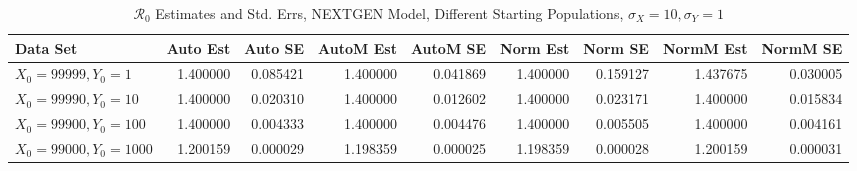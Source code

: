 \documentclass[12pt]{article}
\newcommand{\rr}{\ensuremath{\mathcal{R}_0}}
\begin{document}
\begin{table}[H]
	
	\caption{$\rr$ Estimates and Std. Errs, NEXTGEN Model,
		Different Starting Populations, 
		$\sigma_X = 10, \sigma_Y = 1$}
	\begin{footnotesize}
		\hskip -1.7cm
		\begin{tabular}{l|r|r|r|r|r|r|r|r}
			\hline
			Data Set & Auto Est & Auto SE & AutoM Est & AutoM SE & Norm Est & Norm SE & NormM Est & NormM SE\\
			\hline
			$X_0 = 99999, Y_0 = 1$ & 1.400000 & 0.085421 & 1.400000 & 0.041869 & 1.400000 & 0.159127 & 1.437675 & 0.030005\\
			\hline
			$X_0 = 99990, Y_0 = 10$ & 1.400000 & 0.020310 & 1.400000 & 0.012602 & 1.400000 & 0.023171 & 1.400000 & 0.015834\\
			\hline
			$X_0 = 99900, Y_0 = 100$ & 1.400000 & 0.004333 & 1.400000 & 0.004476 & 1.400000 & 0.005505 & 1.400000 & 0.004161\\
			\hline
			$X_0 = 99000, Y_0 = 1000$ & 1.200159 & 0.000029 & 1.198359 & 0.000025 & 1.198359 & 0.000028 & 1.200159 & 0.000031\\
			\hline
		\end{tabular}
	\end{footnotesize}
\end{table}
\end{document}
